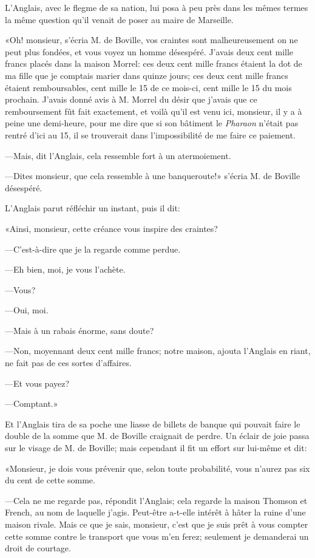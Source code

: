 L'Anglais, avec le flegme de sa nation, lui posa à peu près dans les mêmes termes la même question qu'il venait de poser au maire de Marseille.

«Oh! monsieur, s'écria M. de Boville, vos craintes sont malheureusement on ne peut plus fondées, et vous voyez un homme désespéré. J'avais deux cent mille francs placés dans la maison Morrel: ces deux cent mille francs étaient la dot de ma fille que je comptais marier dans quinze jours; ces deux cent mille francs étaient remboursables, cent mille le 15 de ce mois-ci, cent mille le 15 du mois prochain. J'avais donné avis à M. Morrel du désir que j'avais que ce remboursement fût fait exactement, et voilà qu'il est venu ici, monsieur, il y a à peine une demi-heure, pour me dire que si son bâtiment le \textit{Pharaon} n'était pas rentré d'ici au 15, il se trouverait dans l'impossibilité de me faire ce paiement.

—Mais, dit l'Anglais, cela ressemble fort à un atermoiement.

—Dites monsieur, que cela ressemble à une banqueroute!» s'écria M. de Boville désespéré.

L'Anglais parut réfléchir un instant, puis il dit:

«Ainsi, monsieur, cette créance vous inspire des craintes?

—C'est-à-dire que je la regarde comme perdue.

—Eh bien, moi, je vous l'achète.

—Vous?

—Oui, moi.

—Mais à un rabais énorme, sans doute?

—Non, moyennant deux cent mille francs; notre maison, ajouta l'Anglais en riant, ne fait pas de ces sortes d'affaires.

—Et vous payez?

—Comptant.»

Et l'Anglais tira de sa poche une liasse de billets de banque qui pouvait faire le double de la somme que M. de Boville craignait de perdre. Un éclair de joie passa sur le visage de M. de Boville; mais cependant il fit un effort sur lui-même et dit:

«Monsieur, je dois vous prévenir que, selon toute probabilité, vous n'aurez pas six du cent de cette somme.

—Cela ne me regarde pas, répondit l'Anglais; cela regarde la maison Thomson et French, au nom de laquelle j'agis. Peut-être a-t-elle intérêt à hâter la ruine d'une maison rivale. Mais ce que je sais, monsieur, c'est que je suis prêt à vous compter cette somme contre le transport que vous m'en ferez; seulement je demanderai un droit de courtage.

